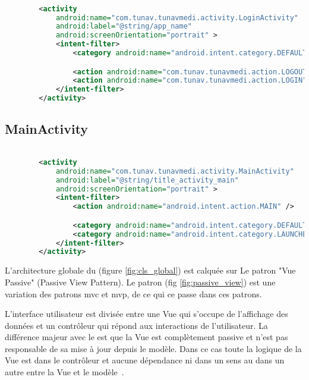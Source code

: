 \begin{lstlisting}[language=xml, caption=Déclaration de LoginActivity dans AndroidManifest]

        <activity
            android:name="com.tunav.tunavmedi.activity.LoginActivity"
            android:label="@string/app_name"
            android:screenOrientation="portrait" >
            <intent-filter>
                <category android:name="android.intent.category.DEFAULT" />

                <action android:name="com.tunav.tunavmedi.action.LOGOUT" />
                <action android:name="com.tunav.tunavmedi.action.LOGIN" />
            </intent-filter>
        </activity>

\end{lstlisting}



\subsection{MainActivity}

\begin{lstlisting}[language=xml, caption=Déclaration dans AndroidManifest de MainActivity]

        <activity
            android:name="com.tunav.tunavmedi.activity.MainActivity"
            android:label="@string/title_activity_main"
            android:screenOrientation="portrait" >
            <intent-filter>
                <action android:name="android.intent.action.MAIN" />

                <category android:name="android.intent.category.DEFAULT" />
                <category android:name="android.intent.category.LAUNCHER" />
            </intent-filter>
        </activity>

\end{lstlisting}

L'architecture globale du   (figure \ref{fig:cls_global})
est calquée sur Le patron "Vue Passive" (Passive View Pattern). Le patron
 (fig \ref{fig:passive_view}) est une variation des
patrons \gls{mvc} et \gls{mvp}, de ce qui ce passe dans ces patrons.

L'interface utilisateur est divisée entre une Vue qui s'occupe de
l'affichage des données et un contrôleur qui répond aux interactions de
l'utilisateur. La différence majeur avec le  est que la
Vue est complètement passive et n'est pas responsable de sa mise à jour
depuis le modèle. Dans ce cas toute la logique de la Vue est dans le
contrôleur et aucune dépendance ni dans un sens au dans un autre entre
la Vue et le modèle~\cite{fowler:passive_view}.

